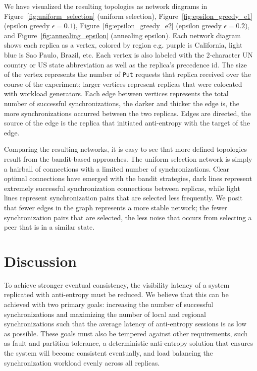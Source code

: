 We have visualized the resulting topologies as network diagrams in
Figure~\ref{fig:uniform_selection} (uniform selection),
Figure~\ref{fig:epsilon_greedy_e1} (epsilon greedy $\epsilon=0.1$),
Figure~\ref{fig:epsilon_greedy_e2} (epsilon greedy $\epsilon=0.2$), and
Figure~\ref{fig:annealing_epsilon} (annealing epsilon).
Each network diagram shows each replica as a vertex, colored by region e.g.
purple is California, light blue is Sao Paulo, Brazil, etc.
Each vertex is also labeled with the 2-character UN country or US state
abbreviation as well as the replica's precedence id.
The size of the vertex represents the number of \texttt{Put} requests that
replica received over the course of the experiment; larger vertices
represent replicas that were colocated with workload generators.
Each edge between vertices represents the total number of successful
synchronizations, the darker and thicker the edge is, the more
synchronizations occurred between the two replicas.
Edges are directed, the source of the edge is the replica that initiated
anti-entropy with the target of the edge.

Comparing the resulting networks, it is easy to see that more defined
topologies result from the bandit-based approaches.
The uniform selection network is simply a hairball of connections with
a limited number of synchronizations.
Clear optimal connections have emerged with the bandit strategies, dark
lines represent extremely successful synchronization connections between
replicas, while light lines represent synchronization pairs that are
selected less frequently.
We posit that fewer edges in the graph represents a more stable network;
the fewer synchronization pairs that are selected, the less noise that
occurs from selecting a peer that is in a similar state.

\section*{Discussion}

To achieve stronger eventual consistency, the visibility latency
of a system replicated with anti-entropy must be reduced.
We believe that this can be achieved with two primary goals: increasing
the number of successful synchronizations and maximizing the number
of local and regional synchronizations such that the average latency of
anti-entropy sessions is as low as possible.
These goals must also be tempered against other requirements, such as
fault and partition tolerance, a deterministic anti-entropy solution that
ensures the system will become consistent eventually, and load balancing
the synchronization workload evenly across all replicas.


